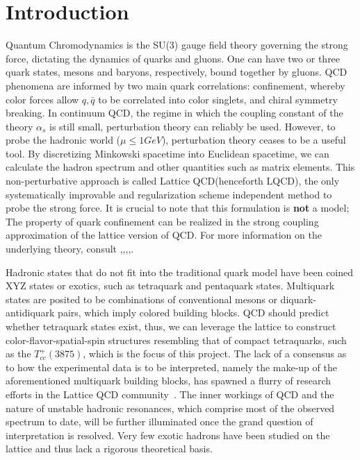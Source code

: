 
\chapter{Introduction}
\label{sec:intro}
\newcommand{\todo}[1]{\textbf{\color{red}TODO: #1}}

Quantum Chromodynamics is the SU(3) gauge field theory governing the strong force, dictating the dynamics of quarks and gluons. One can have two or three quark states, mesons and baryons, respectively, bound together by gluons. QCD phenomena are informed by two main quark correlations: confinement, whereby color forces allow $q,\bar{q}$ to be correlated into color singlets, and chiral symmetry breaking. In continuum QCD, the regime in which the coupling constant of the theory $\alpha_s$ is still small, perturbation theory can reliably be used. However, to probe the hadronic world ($\mu \leq 1 GeV$), perturbation theory ceases to be a useful tool. By discretizing Minkowski spacetime into Euclidean spacetime, we can calculate the hadron spectrum and other quantities such as matrix elements.  This non-perturbative approach is called Lattice QCD(henceforth LQCD), the only systematically improvable and regularization scheme independent method to probe the strong force. It is crucial to note that this formulation is \textbf{not} a model; The property of quark confinement can be realized in the strong coupling approximation of the lattice version of QCD. For more information on the underlying theory, consult \cite{10.5555/3029317},\cite{gupta1998introductionlatticeqcd},\cite{Gattringer2009QuantumCO},\cite{Griffiths:1987tj},\cite{Cheng1984GaugeTO}.


Hadronic states that do not fit into the traditional quark model have been coined XYZ states \cite{Brambilla:2019esw} or exotics, such as tetraquark and pentaquark states\cite{Cheung_2017}. Multiquark states are posited to be combinations of conventional mesons or diquark-antidiquark pairs, which imply colored building blocks. QCD should predict whether tetraquark states exist, thus, we can leverage the lattice to construct color-flavor-spatial-spin structures resembling that of compact tetraquarks, such as the $T_{cc}^+(3875)$, which is the focus of this project.  The lack of a consensus as to how the experimental data is to be interpreted, namely the make-up of the aforementioned multiquark building blocks, has spawned a flurry of research efforts in the Lattice QCD community~\cite{Cheung_2017}. The inner workings of QCD and the nature of unstable hadronic resonances, which comprise most of the observed spectrum to date,  will be further illuminated once the grand question of interpretation is resolved. Very few exotic hadrons have been studied on the lattice and thus lack a rigorous theoretical basis.

